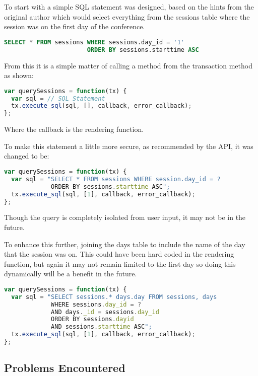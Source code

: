 \documentclass[10pt, a4paper]{article}
\begin{document}
To start with a simple SQL statement was designed, based on the hints from the
original author which would select everything from the sessions table where the
session was on the first day of the conference.

\begin{lstlisting}[language=sql]
SELECT * FROM sessions WHERE sessions.day_id = '1'
                       ORDER BY sessions.starttime ASC
\end{lstlisting}

From this it is a simple matter of calling a method from the transaction method
as shown:

\begin{lstlisting}[language=javascript]
var querySessions = function(tx) {
  var sql = // SQL Statement
  tx.execute_sql(sql, [], callback, error_callback);
};
\end{lstlisting}

Where the callback is the rendering function.

To make this statement a little more secure, as recommended by the API, it was
changed to be:

\begin{lstlisting}[language=javascript]
var querySessions = function(tx) {
  var sql = "SELECT * FROM sessions WHERE session.day_id = ? 
             ORDER BY sessions.starttime ASC";
  tx.execute_sql(sql, [1], callback, error_callback);
};
\end{lstlisting}

Though the query is completely isolated from user input, it may not be in the
future.

To enhance this further, joining the days table to include the name of the day
that the session was on. This could have been hard coded in the rendering
function, but again it may not remain limited to the first day so doing this
dynamically will be a benefit in the future.

\begin{lstlisting}[language=javascript]
var querySessions = function(tx) {
  var sql = "SELECT sessions.* days.day FROM sessions, days 
             WHERE sessions.day_id = ? 
             AND days._id = sessions.day_id 
             ORDER BY sessions.dayid 
             AND sessions.starttime ASC";
  tx.execute_sql(sql, [1], callback, error_callback);
};
\end{lstlisting}

\subsection{Problems Encountered}
\end{document}
